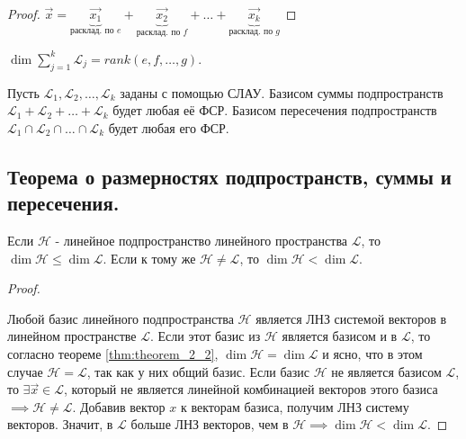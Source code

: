 \begin{proof}
    $\vec{x} = \underbrace{\vec{x_1}}_{\text{расклад. по $e$}} + \underbrace{\vec{x_2}}_{\text{расклад. по $f$}} + \ldots + \underbrace{\vec{x_k}}_{\text{расклад. по $g$}}$
\end{proof}

\begin{proposition}
    $\dim \sum_{j=1}^{k} \mathcal{L}_j = rank(e, f, \ldots, g)$.
\end{proposition}

Пусть $\mathcal{L}_1, \mathcal{L}_2, \ldots, \mathcal{L}_k$ заданы с помощью СЛАУ. Базисом суммы подпространств $\mathcal{L}_1 + \mathcal{L}_2 + \ldots + \mathcal{L}_k$ будет любая её ФСР. Базисом пересечения подпространств $\mathcal{L}_1 \cap \mathcal{L}_2 \cap \ldots \cap \mathcal{L}_k$ будет любая его ФСР.


\newpage


\subsection{
    Теорема о размерностях подпространств, суммы и пересечения.
}

\begin{theorem}
    Если $\mathcal{H}$ - линейное подпространство линейного пространства $\mathcal{L}$, то $\dim \mathcal{H} \leq \dim \mathcal{L}$. Если к тому же $\mathcal{H} \ne \mathcal{L}$, то $\dim \mathcal{H} < \dim \mathcal{L}$.
\end{theorem}

\begin{proof}~

    Любой базис линейного подпространства $\mathcal{H}$ является ЛНЗ системой векторов в линейном пространстве $\mathcal{L}$. Если этот базис из $\mathcal{H}$ является базисом и в $\mathcal{L}$, то согласно теореме \eqref{thm:theorem_2_2}, $\dim \mathcal{H} = \dim \mathcal{L}$ и ясно, что в этом случае $\mathcal{H} = \mathcal{L}$, так как у них общий базис. Если базис $\mathcal{H}$ не является базисом $\mathcal{L}$, то $\exists \vec{x} \in \mathcal{L}$, который не является линейной комбинацией векторов этого базиса $\implies \mathcal{H} \ne \mathcal{L}$. Добавив вектор $x$ к векторам базиса, получим ЛНЗ систему векторов. Значит, в $\mathcal{L}$ больше ЛНЗ векторов, чем в $\mathcal{H} \implies \dim \mathcal{H} < \dim \mathcal{L}$.
\end{proof}

